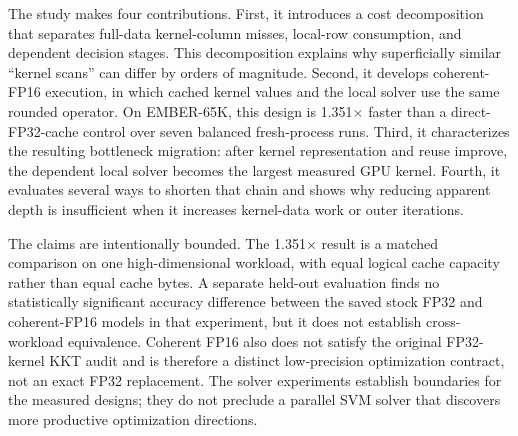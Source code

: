 The study makes four contributions. First, it introduces a cost decomposition
that separates full-data kernel-column misses, local-row consumption, and
dependent decision stages. This decomposition explains why superficially
similar ``kernel scans'' can differ by orders of magnitude. Second, it
develops coherent-FP16 execution, in which cached kernel values and the local
solver use the same rounded operator. On EMBER-65K, this design is
1.351$\times$ faster than a direct-FP32-cache control over seven balanced
fresh-process runs. Third, it characterizes the resulting bottleneck
migration: after kernel representation and reuse improve, the dependent local
solver becomes the largest measured GPU kernel. Fourth, it evaluates several
ways to shorten that chain and shows why reducing apparent depth is
insufficient when it increases kernel-data work or outer iterations.

The claims are intentionally bounded. The 1.351$\times$ result is a matched
comparison on one high-dimensional workload, with equal logical cache
capacity rather than equal cache bytes. A separate held-out evaluation finds
no statistically significant accuracy difference between the saved stock
FP32 and coherent-FP16 models in that experiment, but it does not establish
cross-workload equivalence. Coherent FP16 also does not satisfy the original
FP32-kernel KKT audit and is therefore a distinct low-precision optimization
contract, not an exact FP32 replacement. The solver experiments establish
boundaries for the measured designs; they do not preclude a parallel SVM
solver that discovers more productive optimization directions.
